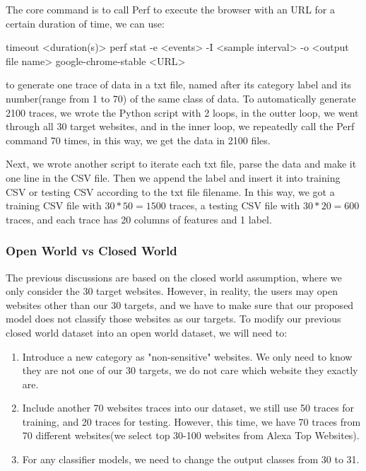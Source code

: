 \documentclass[conference]{IEEEtran}
\begin{document}
The core command is to call Perf to execute the browser with an URL for a certain duration of time, we can use:
\begin{spverbatim}
  timeout <duration(s)> perf stat -e <events> -I <sample interval> -o <output file name> google-chrome-stable <URL>
\end{spverbatim}
to generate one trace of data in a txt file, named after its category label and its number(range from 1 to 70) of the same class of data. To automatically generate 2100 traces, we wrote the Python script with 2 loops, in the outter loop, we went through all 30 target websites, and in the inner loop, we repeatedly call the Perf command 70 times, in this way, we get the data in 2100 files. 

Next, we wrote another script to iterate each txt file, parse the data and make it one line in the CSV file. Then we append the label and insert it into training CSV or testing CSV according to the txt file filename. In this way, we got a training CSV file with $30*50=1500$ traces, a testing CSV file with $30*20=600$ traces, and each trace has 20 columns of features and 1 label.

\subsubsection{Open World vs Closed World}
The previous discussions are based on the closed world assumption, where we only consider the 30 target websites. However, in reality, the users may open websites other than our 30 targets, and we have to make sure that our proposed model does not classify those websites as our targets. To modify our previous closed world dataset into an open world dataset, we will need to:
\begin{enumerate}
    \item Introduce a new category as "non-sensitive" websites. We only need to know they are not one of our 30 targets, we do not care which website they exactly are.
    \item Include another 70 websites traces into our dataset, we still use 50 traces for training, and 20 traces for testing. However, this time, we have 70 traces from 70 different websites(we select top 30-100 websites from Alexa Top Websites).
    \item For any classifier models, we need to change the output classes from 30 to 31.
\end{enumerate}
\end{document}

